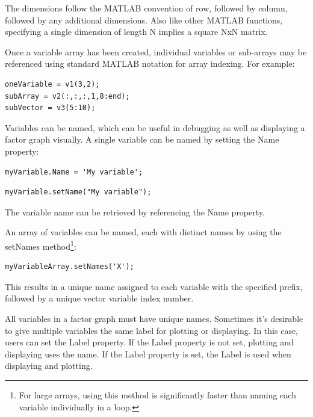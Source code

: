The dimensions follow the MATLAB convention of row, followed by column, followed by any additional dimensions.  Also like other MATLAB functions, specifying a single dimension of length N implies a square NxN matrix.

Once a variable array has been created, individual variables or sub-arrays may be referenced using standard MATLAB notation for array indexing.  For example:

\begin{lstlisting}
oneVariable = v1(3,2);
subArray = v2(:,:,:,1,8:end);
subVector = v3(5:10);
\end{lstlisting}

\fi


Variables can be named, which can be useful in debugging as well as displaying a factor graph visually.  A single variable can be named by setting the Name property:

\ifmatlab
\begin{lstlisting}
myVariable.Name = 'My variable';
\end{lstlisting}
\fi

\ifjava
\begin{lstlisting}
myVariable.setName("My variable");
\end{lstlisting}

\fi

The variable name can be retrieved by referencing the Name property.

\ifmatlab

An array of variables can be named, each with distinct names by using the setNames method\footnote{For large arrays, using this method is significantly faster than naming each variable individually in a loop.}:

\begin{lstlisting}
myVariableArray.setNames('X');
\end{lstlisting}

This results in a unique name assigned to each variable with the specified prefix, followed by a unique vector variable index number.

\fi

All variables in a factor graph must have unique names.  Sometimes it's desirable to give multiple variables the same label for plotting or displaying.  In this case, users can set the Label property.  If the Label property is not set, plotting and displaying uses the name.  If the Label property is set, the Label is used when displaying and plotting.

